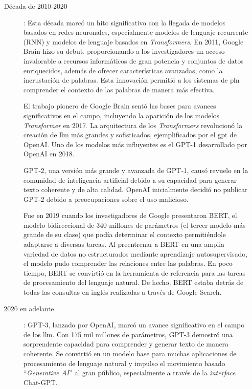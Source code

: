 \begin{description}
\item[Década de 2010-2020]: Esta década marcó un hito significativo con la llegada de modelos basados en redes neuronales, especialmente modelos de lenguaje recurrente (RNN) y modelos de lenguaje basados en \textit{Transformers}. En 2011, Google Brain hizo su debut, proporcionando a los investigadores un acceso invalorable a recursos informáticos de gran potencia y conjuntos de datos enriquecidos, además de ofrecer características avanzadas, como la incrustación de palabras. Esta innovación permitió a los sistemas de \acrlong{pln} comprender el contexto de las palabras de manera más efectiva. 

El trabajo pionero de Google Brain sentó las bases para avances significativos en el campo, incluyendo la aparición de los modelos \textit{Transformer} en 2017. La arquitectura de los \textit{Transformers} revolucionó la creación de \acrfull{llm} más grandes y sofisticados, ejemplificados por el \acrfull{gpt} de OpenAI. Uno de los modelos más influyentes es el GPT-1 desarrollado por OpenAI en 2018.

GPT-2, una versión más grande y avanzada de GPT-1, causó revuelo en la comunidad de inteligencia artificial debido a su capacidad para generar texto coherente y de alta calidad. OpenAI inicialmente decidió no publicar GPT-2 debido a preocupaciones sobre el uso malicioso. 

Fue en 2019 cuando los investigadores de Google presentaron BERT, el modelo bidireccional de 340 millones de parámetros (el tercer modelo más grande de su clase) que podía determinar el contexto permitiéndole adaptarse a diversas tareas. Al preentrenar a BERT en una amplia variedad de datos no estructurados mediante aprendizaje autosupervisado, el modelo pudo comprender las relaciones entre las palabras. En poco tiempo, BERT se convirtió en la herramienta de referencia para las tareas de procesamiento del lenguaje natural. De hecho, BERT estaba detrás de todas las consultas en inglés realizadas a través de Google Search.

\item[2020 en adelante]: GPT-3, lanzado por OpenAI, marcó un avance significativo en el campo de los \acrshort{llm}. Con 175 mil millones de parámetros, GPT-3 demostró una sorprendente capacidad para comprender y generar texto de manera coherente. Se convirtió en un modelo base para muchas aplicaciones de procesamiento de lenguaje natural y impulso el movimiento basado ``\textit{Generative AI}'' al gran público, especialmente a través de la \textit{interface} Chat-GPT.


\end{description}
